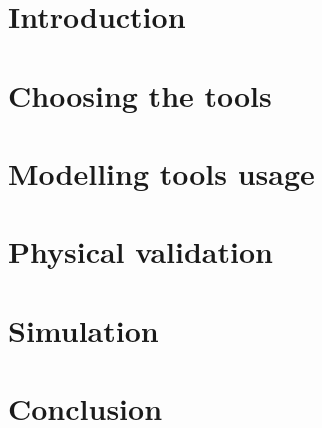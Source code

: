 \documentclass[12pt,a4paper, twoside]{report}
\begin{document}


\tableofcontents

\listoffigures

\clearpage
\setcounter{page}{1}
\chapter{Introduction}


\chapter{Choosing the tools}


\chapter{Modelling tools usage}


\chapter{Physical validation}


\chapter{Simulation}


\chapter{Conclusion}




\end{document}
